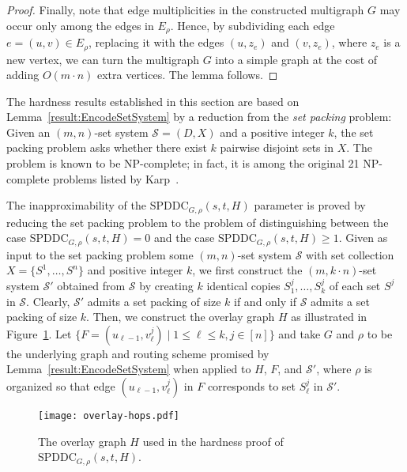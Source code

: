 \LongVersion \documentclass[11pt]{article}
\theoremstyle{definition}
\theoremstyle{plain}
\newcommand{\SPDDC}[0]{\mathrm{SPDDC}}
\newcommand{\CalS}[0]{\mathcal{S}}
\begin{document}
\begin{proof}
Finally, note that edge multiplicities in the constructed multigraph $G$ 
may occur only among the edges in $E_{\rho}$.
Hence, by subdividing each edge $e = (u, v) \in E_{\rho}$, replacing it with the
edges $(u, z_e)$ and $(v, z_e)$, where $z_e$ is a new vertex, we can turn the
multigraph $G$ into a simple graph at the cost of adding $O (m \cdot n)$ extra
vertices. The lemma follows.
\end{proof}

The hardness results established in this section are based on
Lemma~\ref{result:EncodeSetSystem} by a reduction from the \emph{set packing}
problem:
Given an $(m, n)$-set system $\CalS = (D, X)$ and a positive integer $k$, the
set packing problem asks whether there exist $k$ pairwise disjoint sets in
$X$.
The problem is known to be NP-complete;
in fact, it is among the original 21 NP-complete problems listed by
Karp~\cite{Karp72}.

The inapproximability of the $\SPDDC_{G, \rho}(s, t, H)$ parameter is proved
by reducing the set packing problem to the problem of distinguishing between 
the case
$\SPDDC_{G, \rho}(s, t, H) = 0$ and the case $\SPDDC_{G, \rho}(s, t, H) \geq 1$.
Given as input to the set packing problem some $(m, n)$-set system $\CalS$
with set collection $X = \{ S^1, \dots, S^n \}$ and positive integer $k$,
we first construct the $(m, k \cdot n)$-set system $\CalS'$ obtained
from $\CalS$ by creating $k$ identical copies $S_{1}^{j}, \dots, S_{k}^{j}$
of each set $S^j$ in $\CalS$.
Clearly, $\CalS'$ admits a set packing of size $k$ if and only if $\CalS$
admits a set packing of size $k$.
Then, we construct the overlay graph $H$ as illustrated in
Figure~\ref{figure:OverlayHops}.
Let $\{ F = (u_{\ell - 1}, v_{\ell}^{j}) \mid 1 \leq \ell \leq k, j \in [n] \}$ and
take $G$ and $\rho$ to be the underlying graph and routing scheme promised by
Lemma~\ref{result:EncodeSetSystem} when applied to $H$, $F$, and
$\CalS'$, where $\rho$ is organized so that edge $(u_{\ell - 1},
v_{\ell}^{j})$ in $F$ corresponds to set $S_{\ell}^{j}$ in $\CalS'$.

\begin{figure}
\begin{center}
\texttt{[image: overlay-hops.pdf]}
\end{center}
\caption{\label{figure:OverlayHops}
The overlay graph $H$ used in the hardness proof of $\SPDDC_{G, \rho}(s, t, H)$.
}
\end{figure}
\end{document}

